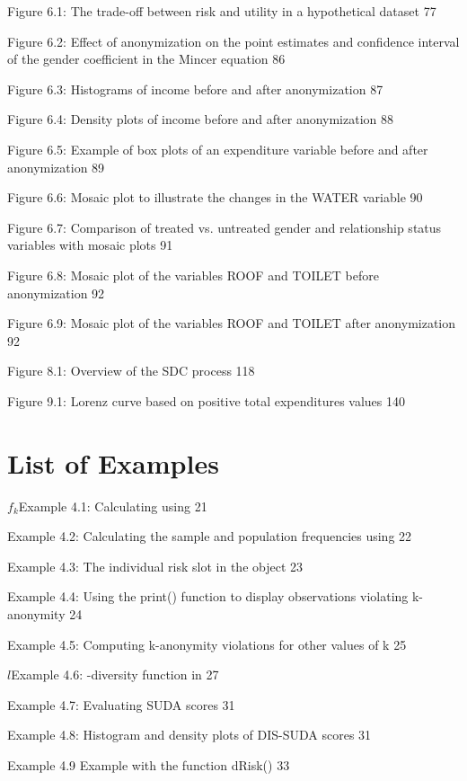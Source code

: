 \documentclass[letterpaper,10pt,english]{sphinxmanual}
\begin{document}
Figure 6.1: The trade-off between risk and utility in a hypothetical
dataset 77

Figure 6.2: Effect of anonymization on the point estimates and
confidence interval of the gender coefficient in the Mincer equation 86

Figure 6.3: Histograms of income before and after anonymization 87

Figure 6.4: Density plots of income before and after anonymization 88

Figure 6.5: Example of box plots of an expenditure variable before and
after anonymization 89

Figure 6.6: Mosaic plot to illustrate the changes in the WATER variable
90

Figure 6.7: Comparison of treated vs. untreated gender and relationship
status variables with mosaic plots 91

Figure 6.8: Mosaic plot of the variables ROOF and TOILET before
anonymization 92

Figure 6.9: Mosaic plot of the variables ROOF and TOILET after
anonymization 92

Figure 8.1: Overview of the SDC process 118

Figure 9.1: Lorenz curve based on positive total expenditures values 140


\section{List of Examples}
\label{\detokenize{lists:list-of-examples}}
\(f_{k}\)Example 4.1: Calculating using  21

Example 4.2: Calculating the sample and population frequencies using
 22

Example 4.3: The individual risk slot in the  object 23

Example 4.4: Using the print() function to display observations
violating k-anonymity 24

Example 4.5: Computing k-anonymity violations for other values of k 25

\(l\)Example 4.6: -diversity function in  27

Example 4.7: Evaluating SUDA scores 31

Example 4.8: Histogram and density plots of DIS-SUDA scores 31

Example 4.9 Example with the function dRisk() 33
\end{document}
